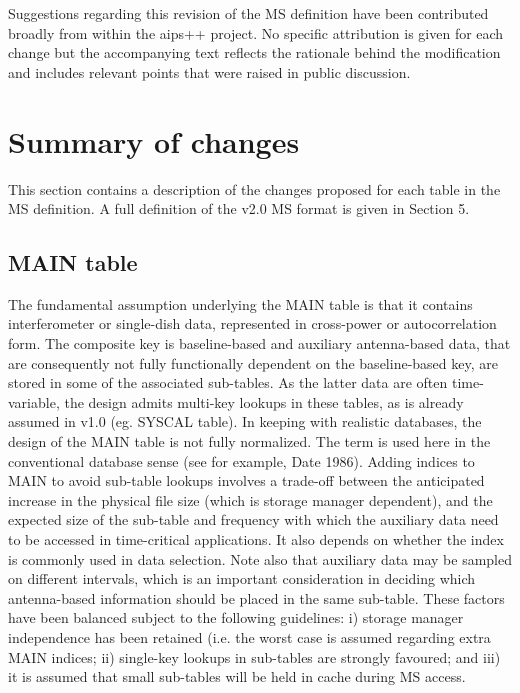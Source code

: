 \documentclass{article}
\begin{document}
Suggestions regarding this revision of the MS definition have been
contributed broadly from within the aips++ project. No specific
attribution is given for each change but the accompanying text
reflects the rationale behind the modification and includes relevant
points that were raised in public discussion.

\section{Summary of changes}

This section contains a description of the changes proposed for each
table in the MS definition. A full definition of the v2.0 MS format is
given in Section 5.

\subsection{MAIN table}

The fundamental assumption underlying the MAIN table is that it
contains interferometer or single-dish data, represented in
cross-power or autocorrelation form. The composite key is
baseline-based and auxiliary antenna-based data, that are consequently
not fully functionally dependent on the baseline-based key, are stored
in some of the associated sub-tables. As the latter data are often
time-variable, the design admits multi-key lookups in these tables, as
is already assumed in v1.0 (eg. SYSCAL table). In keeping with
realistic databases, the design of the MAIN table is not fully
normalized. The term is used here in the conventional database sense
(see for example, Date 1986). Adding indices to MAIN to avoid
sub-table lookups involves a trade-off between the anticipated
increase in the physical file size (which is storage manager
dependent), and the expected size of the sub-table and frequency with
which the auxiliary data need to be accessed in time-critical
applications. It also depends on whether the index is commonly used in
data selection. Note also that auxiliary data may be sampled on
different intervals, which is an important consideration in deciding
which antenna-based information should be placed in the same
sub-table. These factors have been balanced subject to the following
guidelines: i) storage manager independence has been retained
(i.e. the worst case is assumed regarding extra MAIN indices; ii)
single-key lookups in sub-tables are strongly favoured; and iii) it is
assumed that small sub-tables will be held in cache during MS access.
\end{document}
